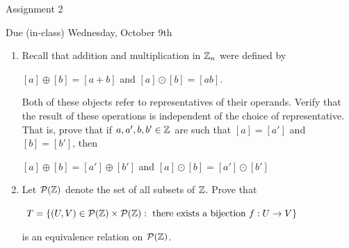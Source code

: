 \documentclass[11pt,fleqn,dvipsnames,usenames]{article}
\renewcommand{\headrulewidth}{1pt}
\newcommand{\p}{\noindent}
\begin{document}
\fancyhead[L]{\course}
\fancyhead[R]{\term}
\renewcommand{\headrulewidth}{0.4pt}

\begin{center}
{\huge Assignment 2}
\vsp

{\large Due (in-class) Wednesday, October 9th}
\end{center}

\begin{enumerate}
\item Recall that addition and multiplication in $\mathbb{Z}_n$ were defined by
\begin{center}
$[a] \oplus [b] = [a + b]$ and $[a]\odot [b] = [ab]$.
\end{center}
\p Both of these objects refer to representatives of their operands.  Verify that the result of these operations is independent of the choice of representative.  That is, prove that if $a,a',b,b'\in\mathbb{Z}$ are such that $[a] = [a']$ and $[b] = [b']$, then
\begin{center}
$[a]\oplus [b] = [a']\oplus [b']$ and $[a]\odot [b] = [a']\odot [b']$
\end{center}

\item Let $\mathcal{P}(\mathbb{Z})$ denote the set of all subsets of $\mathbb{Z}$.  Prove that
\begin{center}
$T = \left\{(U,V)\in \mathcal{P}(\mathbb{Z})\times\mathcal{P}(\mathbb{Z}):\text{ there exists a bijection }f:U\to V\right\}$
\end{center}
is an equivalence relation on $\mathcal{P}(\mathbb{Z})$.

\end{enumerate}
\vsp
\end{document}
